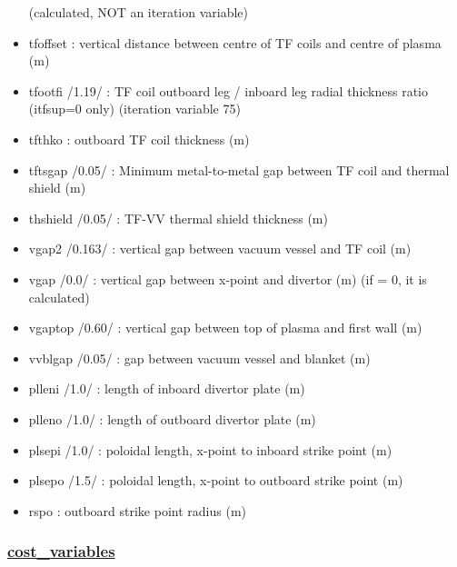 \documentclass[]{article}
\begin{document}
\begin{itemize}
  (calculated, NOT an iteration variable)
\item
  tfoffset : vertical distance between centre of TF coils and centre of
  plasma (m)
\item
  tfootfi /1.19/ : TF coil outboard leg / inboard leg radial thickness
  ratio (itfsup=0 only) (iteration variable 75)
\item
  tfthko : outboard TF coil thickness (m)
\item
  tftsgap /0.05/ : Minimum metal-to-metal gap between TF coil and
  thermal shield (m)
\item
  thshield /0.05/ : TF-VV thermal shield thickness (m)
\item
  vgap2 /0.163/ : vertical gap between vacuum vessel and TF coil (m)
\item
  vgap /0.0/ : vertical gap between x-point and divertor (m) (if = 0, it
  is calculated)
\item
  vgaptop /0.60/ : vertical gap between top of plasma and first wall (m)
\item
  vvblgap /0.05/ : gap between vacuum vessel and blanket (m)
\item
  plleni /1.0/ : length of inboard divertor plate (m)
\item
  plleno /1.0/ : length of outboard divertor plate (m)
\item
  plsepi /1.0/ : poloidal length, x-point to inboard strike point (m)
\item
  plsepo /1.5/ : poloidal length, x-point to outboard strike point (m)
\item
  rspo : outboard strike point radius (m)
\end{itemize}

\subsubsection{\href{cost_variables.html}{cost\_variables}}
\end{document}
